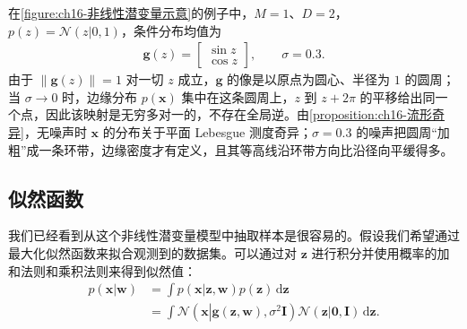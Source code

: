 \documentclass[../../main.tex]{subfiles}
\begin{document}
\begin{example}[ 一维潜空间与圆周流形]\label{example:ch16-圆周流形}
在\cref{figure:ch16-非线性潜变量示意}的例子中，$M=1$、$D=2$，$p(z)=\mathcal{N}(z|0,1)$，条件分布均值为
\begin{align*}
  \bm{g}(z)=\begin{bmatrix}\sin z\\ \cos z\end{bmatrix},\qquad \sigma=0.3 .
\end{align*}
由于 $\|\bm{g}(z)\|=1$ 对一切 $z$ 成立，$\bm{g}$ 的像是以原点为圆心、半径为 $1$ 的圆周；当 $\sigma\rightarrow0$ 时，边缘分布 $p(\bm{x})$ 集中在这条圆周上，$z$ 到 $z+2\pi$ 的平移给出同一个点，因此该映射是无穷多对一的，不存在全局逆。由\cref{proposition:ch16-流形奇异}，无噪声时 $\bm{x}$ 的分布关于平面 Lebesgue 测度奇异；$\sigma=0.3$ 的噪声把圆周“加粗”成一条环带，边缘密度才有定义，且其等高线沿环带方向比沿径向平缓得多。
\end{example}

\subsection{似然函数}\label{subsection:ch16-非线性似然函数}

我们已经看到从这个非线性潜变量模型中抽取样本是很容易的。假设我们希望通过最大化似然函数来拟合观测到的数据集。可以通过对 $\bm{z}$ 进行积分并使用概率的加和法则和乘积法则来得到似然值：
\begin{align}
  p(\bm{x}|\bm{w})&=\int p(\bm{x}|\bm{z},\bm{w})p(\bm{z})\,\mathrm{d}\bm{z}\nonumber\\
  &=\int\mathcal{N}\left(\bm{x}\left|\bm{g}(\bm{z},\bm{w}),\sigma^2\bm{I}\right.\right)\mathcal{N}(\bm{z}|\bm{0},\bm{I})\,\mathrm{d}\bm{z}.
  \label{align:ch16-非线性似然}
\end{align}
\end{document}
